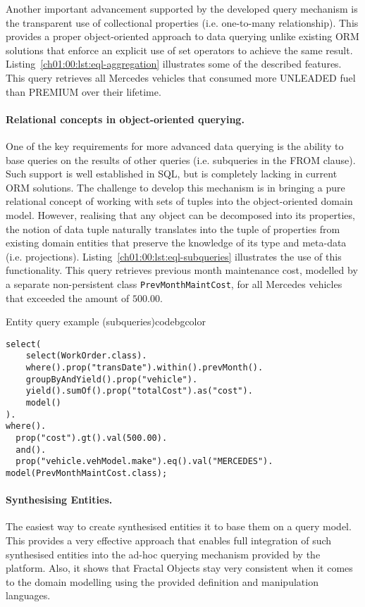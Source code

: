   Another important advancement supported by the developed query mechanism is the transparent use of collectional properties (i.e. one-to-many relationship).
  This provides a proper object-oriented approach to data querying unlike existing ORM solutions that enforce an explicit use of set operators to achieve the same result.
  Listing~\ref{ch01:00:lst:eql-aggregation} illustrates some of the described features.  
  This query retrieves all Mercedes vehicles that consumed more UNLEADED fuel than PREMIUM over their lifetime.

\paragraph{Relational concepts in object-oriented querying.}

  One of the key requirements for more advanced data querying is the ability to base queries on the results of other queries (i.e. subqueries in the FROM clause).
  Such support is well established in SQL, but is completely lacking in current ORM solutions.
  The challenge to develop this mechanism is in bringing a pure relational concept of working with sets of tuples into the object-oriented domain model.
  However, realising that any object can be decomposed into its properties, the notion of data tuple naturally translates into the tuple of properties from existing domain entities that preserve the knowledge of its type and meta-data (i.e. projections).
  Listing~\ref{ch01:00:lst:eql-subqueries} illustrates the use of this functionality.
  This query retrieves previous month maintenance cost, modelled by a separate non-persistent class \texttt{PrevMonthMaintCost}, for all Mercedes vehicles that exceeded the amount of $500.00$.
  
  \begin{code}{Entity query example (subqueries)}{\label{ch01:00:lst:eql-subqueries}}{codebgcolor}
    \begin{lstlisting}[numbersep=10pt]
select(
    select(WorkOrder.class).
    where().prop("transDate").within().prevMonth().
    groupByAndYield().prop("vehicle").
    yield().sumOf().prop("totalCost").as("cost").
    model()  
).
where().
  prop("cost").gt().val(500.00).
  and().
  prop("vehicle.vehModel.make").eq().val("MERCEDES").
model(PrevMonthMaintCost.class);
    \end{lstlisting}
   \end{code}  

\vspace{-20pt}   
\paragraph{Synthesising Entities.}
  The easiest way to create synthesised entities it to base them on a query model.
  This provides a very effective approach that enables full integration of such synthesised entities into the ad-hoc querying mechanism provided by the platform.
  Also, it shows that Fractal Objects stay very consistent when it comes to the domain modelling using the provided definition and manipulation languages.

